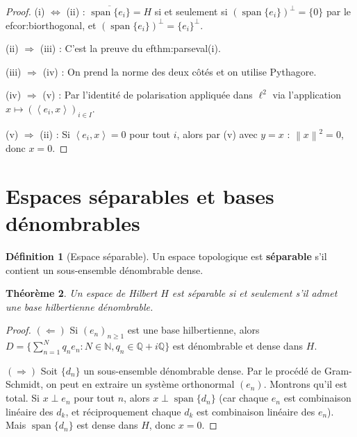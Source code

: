 \documentclass[a4paper,12pt]{book}
\DeclareMathOperator{\spn}{span}
\newcommand{\N}{\mathbb{N}}
\newcommand{\Q}{\mathbb{Q}}
\newcommand{\norm}[1]{\left\| #1 \right\|}
\newcommand{\inner}[2]{\left\langle #1, #2 \right\rangle}
\theoremstyle{definition}
\newtheorem{definition}{Définition}[chapter]
\theoremstyle{plain}
\newtheorem{theoreme}[definition]{Théorème}
\theoremstyle{remark}
\begin{document}
\begin{proof}
(i) $\Leftrightarrow$ (ii) : $\overline{\spn\{e_i\}} = H$ si et seulement si $(\spn\{e_i\})^\perp = \{0\}$ par le 
ef{cor:biorthogonal}, et $(\spn\{e_i\})^\perp = \{e_i\}^\perp$.

(ii) $\Rightarrow$ (iii) : C'est la preuve du 
ef{thm:parseval}(i).

(iii) $\Rightarrow$ (iv) : On prend la norme des deux côtés et on utilise Pythagore.

(iv) $\Rightarrow$ (v) : Par l'identité de polarisation appliquée dans $\ell^2$ via l'application $x \mapsto (\inner{e_i}{x})_{i \in I}$.

(v) $\Rightarrow$ (ii) : Si $\inner{e_i}{x} = 0$ pour tout $i$, alors par (v) avec $y = x$ : $\norm{x}^2 = 0$, donc $x = 0$.
\end{proof}

\section{Espaces séparables et bases dénombrables}

\begin{definition}[Espace séparable]\label{def:separable}
Un espace topologique est \textbf{séparable} s'il contient un sous-ensemble dénombrable dense.
\end{definition}

\begin{theoreme}\label{thm:hilbert-separable-base}
Un espace de Hilbert $H$ est séparable si et seulement s'il admet une base hilbertienne dénombrable.
\end{theoreme}

\begin{proof}
$(\Leftarrow)$ Si $(e_n)_{n\geq 1}$ est une base hilbertienne, alors $D = \{\sum_{n=1}^N q_n e_n : N \in \N, q_n \in \Q + i\Q\}$ est dénombrable et dense dans $H$.

$(\Rightarrow)$ Soit $\{d_n\}$ un sous-ensemble dénombrable dense. Par le procédé de Gram-Schmidt, on peut en extraire un système orthonormal $(e_n)$. Montrons qu'il est total. Si $x \perp e_n$ pour tout $n$, alors $x \perp \spn\{d_n\}$ (car chaque $e_n$ est combinaison linéaire des $d_k$, et réciproquement chaque $d_k$ est combinaison linéaire des $e_n$). Mais $\spn\{d_n\}$ est dense dans $H$, donc $x = 0$.
\end{proof}
\end{document}
